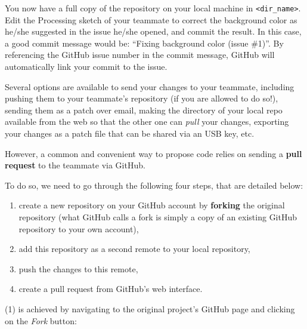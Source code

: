 \documentclass{instructions}
\begin{document}
You now have a full copy of the repository on your local machine in
\texttt{<dir\_name>}. Edit the Processing sketch of your teammate to correct the
background color as he/she suggested in the issue he/she opened, and commit the result.
In this case, a good commit message would be: ``Fixing background color (issue
\#1)''. By referencing the GitHub issue number in the commit message, GitHub will
automatically link your commit to the issue.

Several options are available to send your changes to your teammate, including
pushing them to your teammate's repository (if you are allowed to do so!),
sending them as a patch over email, making the directory of your local repo
available from the web so that the other one can \emph{pull} your changes,
exporting your changes as a patch file that can be shared via an USB key, etc.

However, a common and convenient way to propose code relies on sending a
\textbf{pull request} to the teammate via GitHub.

To do so, we need to go through the following four steps, that are detailed
below:

\begin{enumerate}
    \item create a new repository on your GitHub account by \textbf{forking} the
        original repository (what GitHub calls a fork is simply a copy of an
        existing GitHub repository to your own account),
    \item add this repository as a second remote to your local repository,
    \item push the changes to this remote,
    \item create a pull request from GitHub's web interface.
\end{enumerate}


(1) is achieved by navigating to the original project's GitHub page and
clicking on the \emph{Fork} button:

\begin{center}
\end{center}

\end{document}
